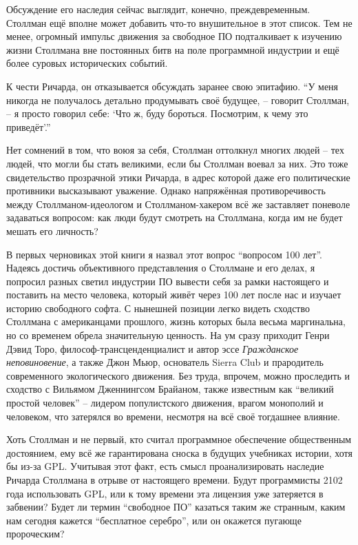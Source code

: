 Обсуждение его наследия сейчас выглядит, конечно, преждевременным. Столлман ещё вполне может добавить что-то внушительное в этот список. Тем не менее, огромный импульс движения за свободное ПО подталкивает к изучению жизни Столлмана вне постоянных битв на поле программной индустрии и ещё более суровых исторических событий.

К чести Ричарда, он отказывается обсуждать заранее свою эпитафию. \enquote{У меня никогда не получалось детально продумывать своё будущее, -- говорит Столлман, -- я просто говорил себе: \enquote{Что ж, буду бороться. Посмотрим, к чему это приведёт}.\hspace{0.01in}}

Нет сомнений в том, что воюя за себя, Столлман оттолкнул многих людей -- тех людей, что могли бы стать великими, если бы Столлман воевал за них. Это тоже свидетельство прозрачной этики Ричарда, в адрес которой даже его политические противники высказывают уважение. Однако напряжённая противоречивость между Столлманом-идеологом и Столлманом-хакером всё же заставляет поневоле задаваться вопросом: как люди будут смотреть на Столлмана, когда им не будет мешать его личность?

В первых черновиках этой книги я назвал этот вопрос \enquote{вопросом 100 лет}. Надеясь достичь объективного представления о Столлмане и его делах, я попросил разных светил индустрии ПО вывести себя за рамки настоящего и поставить на место человека, который живёт через 100 лет после нас и изучает историю свободного софта. С нынешней позиции легко видеть сходство Столлмана с американцами прошлого, жизнь которых была весьма маргинальна, но со временем обрела значительную ценность. На ум сразу приходит Генри Дэвид Торо, философ-трансценденциалист и автор эссе \textit{Гражданское неповиновение}, а также Джон Мьюр, основатель Sierra Club и прародитель современного экологического движения. Без труда, впрочем, можно проследить и сходство с Вильямом Дженнингсом Брайаном, также известным как \enquote{великий простой человек} -- лидером популистского движения, врагом монополий и человеком, что затерялся во времени, несмотря на всё своё тогдашнее влияние.

Хоть Столлман и не первый, кто считал программное обеспечение общественным достоянием, ему всё же гарантирована сноска в будущих учебниках истории, хотя бы из-за GPL. Учитывая этот факт, есть смысл проанализировать наследие Ричарда Столлмана в отрыве от настоящего времени. Будут программисты 2102 года использовать GPL, или к тому времени эта лицензия уже затеряется в забвении? Будет ли термин \enquote{свободное ПО} казаться таким же странным, каким нам сегодня кажется \enquote{бесплатное серебро}, или он окажется пугающе пророческим?

